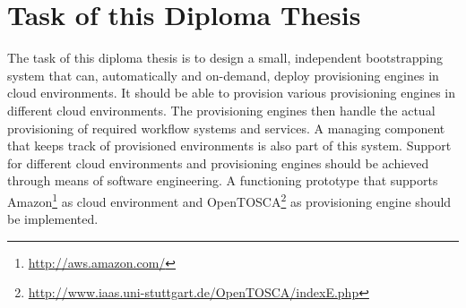 \section{Task of this Diploma Thesis}

The task of this diploma thesis is to design a small, independent bootstrapping system that can, automatically and on-demand, deploy provisioning engines in cloud environments.
It should be able to provision various provisioning engines in different cloud environments.
The provisioning engines then handle the actual provisioning of required workflow systems and services.
A managing component that keeps track of provisioned environments is also part of this system.
Support for different cloud environments and provisioning engines should be achieved through means of software engineering.
A functioning prototype that supports Amazon\footnote{\url{http://aws.amazon.com/}} as cloud environment and OpenTOSCA\footnote{\url{http://www.iaas.uni-stuttgart.de/OpenTOSCA/indexE.php}} as provisioning engine should be implemented.
